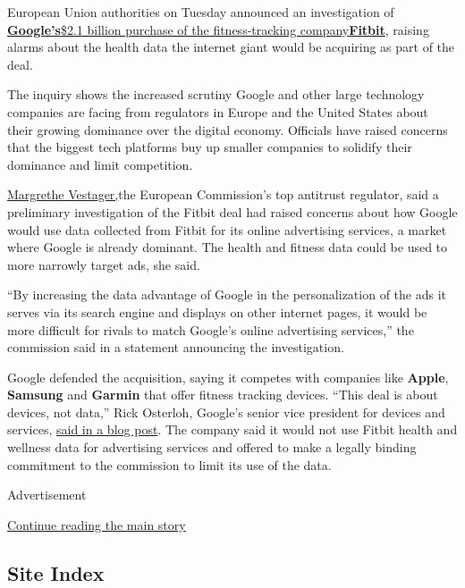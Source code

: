 European Union authorities on Tuesday announced an investigation of
\textbf{\href{https://www.nytimes3xbfgragh.onion/2019/11/01/technology/google-fitbit.html}{Google's}}\href{https://www.nytimes3xbfgragh.onion/2019/11/01/technology/google-fitbit.html}{\$2.1
billion purchase of the fitness-tracking
company}\textbf{\href{https://www.nytimes3xbfgragh.onion/2019/11/01/technology/google-fitbit.html}{Fitbit}},
raising alarms about the health data the internet giant would be
acquiring as part of the deal.

The inquiry shows the increased scrutiny Google and other large
technology companies are facing from regulators in Europe and the United
States about their growing dominance over the digital economy. Officials
have raised concerns that the biggest tech platforms buy up smaller
companies to solidify their dominance and limit competition.

\href{https://ec.europa.eu/commission/presscorner/detail/en/ip_20_1446}{Margrethe
Vestager,}the European Commission's top antitrust regulator, said a
preliminary investigation of the Fitbit deal had raised concerns about
how Google would use data collected from Fitbit for its online
advertising services, a market where Google is already dominant. The
health and fitness data could be used to more narrowly target ads, she
said.

``By increasing the data advantage of Google in the personalization of
the ads it serves via its search engine and displays on other internet
pages, it would be more difficult for rivals to match Google's online
advertising services,'' the commission said in a statement announcing
the investigation.

Google defended the acquisition, saying it competes with companies like
\textbf{Apple}, \textbf{Samsung} and \textbf{Garmin} that offer fitness
tracking devices. ``This deal is about devices, not data,'' Rick
Osterloh, Google's senior vice president for devices and services,
\href{https://blog.google/around-the-globe/google-europe/update-fitbit/}{said
in a blog post}. The company said it would not use Fitbit health and
wellness data for advertising services and offered to make a legally
binding commitment to the commission to limit its use of the data.

Advertisement

\protect\hyperlink{after-bottom}{Continue reading the main story}

\hypertarget{site-index}{%
\subsection{Site Index}\label{site-index}}


